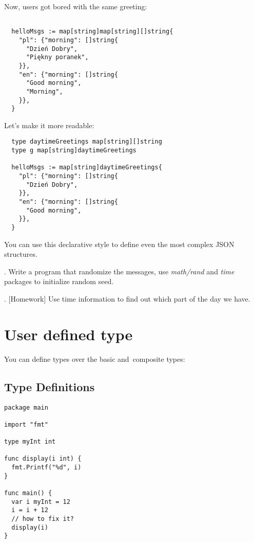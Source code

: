 \documentclass[11pt, letterpaper]{article}
\begin{document}
Now, users got bored with the same greeting:

\begin{verbatim}

  helloMsgs := map[string]map[string][]string{
    "pl": {"morning": []string{
      "Dzień Dobry",
      "Piękny poranek",
    }},
    "en": {"morning": []string{
      "Good morning",
      "Morning",
    }},
  }
\end{verbatim}

Let's make it more readable:

\begin{verbatim}
  type daytimeGreetings map[string][]string
  type g map[string]daytimeGreetings

  helloMsgs := map[string]daytimeGreetings{
    "pl": {"morning": []string{
      "Dzień Dobry",
    }},
    "en": {"morning": []string{
      "Good morning",
    }},
  }
\end{verbatim}

You can use this declarative style to define even the most complex {\small JSON} structures.

. Write a program that randomize the messages, use \emph{math/rand} and \emph{time} packages to initialize random seed.

. [Homework] Use time information to find out which part of the day we have.

\section{User defined type}

You can define types over the basic and~composite types:

\subsection{Type Definitions}

\begin{verbatim}
package main

import "fmt"

type myInt int

func display(i int) {
  fmt.Printf("%d", i)
}

func main() {
  var i myInt = 12
  i = i + 12
  // how to fix it?
  display(i)
}
\end{verbatim}
\end{document}
